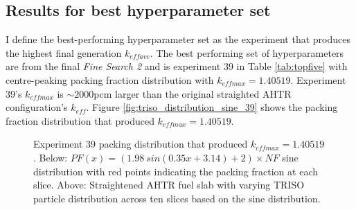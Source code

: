 \subsection{Results for best hyperparameter set}
I define the best-performing hyperparameter set as the experiment that produces 
the highest final generation $k_{eff ave}$. 
The best performing set of hyperparameters are from the final 
\textit{Fine Search 2} and is experiment 39 in Table \ref{tab:topfive}
with centre-peaking packing fraction distribution with $k_{eff max} = 1.40519$. 
Experiment 39's $k_{eff max}$ is $\sim2000$pcm larger than the original 
straighted \gls{AHTR} configuration's $k_{eff}$. 
Figure \ref{fig:triso_distribution_sine_39} shows the packing fraction distribution 
that produced $k_{eff max} = 1.40519$. 
\begin{figure}[]
    \centering
    \caption{Experiment 39 packing distribution that produced $k_{eff max} = 1.40519$. 
    Below: $PF(x) = (1.98\ sin(0.35x+3.14)+2)  \times NF$ sine distribution with 
    red points indicating the packing fraction at each slice. 
    Above: Straightened \acrlong{AHTR} fuel slab with varying \gls{TRISO} particle 
    distribution across ten slices based on the sine distribution. }
    \label{fig:triso_distribution}
\end{figure}


